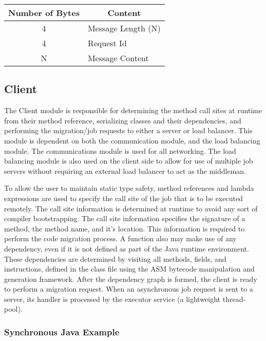 \begin{minipage}{\linewidth}

    \setlength{\belowcaptionskip}{15pt plus 3pt minus 2pt}
    \begin{tabular}{ c l }
        \hline
        \multicolumn{1}{c}{Number of Bytes} & \multicolumn{1}{c}{Content} \\
        \hline
        4 & Message Length (N) \\
        4 & Request Id \\
        N & Message Content \\
    \end{tabular}

\end{minipage}


\subsection{Client}\label{subsec:client}
The Client module is responsible for determining the method call sites at runtime from their
method reference, serializing classes and their dependencies, and performing the migration/job
requests to either a server or load balancer.
This module is dependent on both the communication module, and the load balancing module.
The communications module is used for all networking.
The load balancing module is also used on the client side to allow for use of multiple
job servers without requiring an external load balancer to act as the middleman.

To allow the user to maintain static type safety, method references and lambda expressions
are used to specify the call site of the job that is to be executed remotely.
The call site information is determined at runtime to avoid any sort of compiler
bootstrapping.
The call site information specifies the signature of a method, the method name, and it's location.
This information is required to perform the code migration process.
A function also may make use of any dependency, even if it is not defined as part of the Java
runtime environment.
These dependencies are determined by visiting all methods, fields, and instructions,
defined in the class file using the ASM bytecode manipulation and generation framework.
After the dependency graph is formed, the client is ready to perform a migration request.
When an asynchronous job request is sent to a server, its handler is processed by the executor service
(a lightweight thread-pool).

\subsubsection{Synchronous Java Example}

